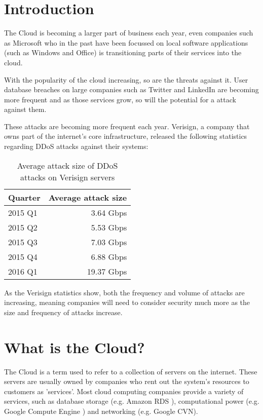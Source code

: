 \section{Introduction}
The Cloud is becoming a larger part of business each year, even companies such as Microsoft who in the past have been focussed on local software applications (such as Windows and Office) is transitioning parts of their services into the cloud. 

With the popularity of the cloud increasing, so are the threats against it. User database breaches on large companies such as Twitter and LinkedIn \cite{linkedin_update_2012} are becoming more frequent and as those services grow, so will the potential for a attack against them.

These attacks are becoming more frequent each year. Verisign, a company that owns part of the internet's core infrastructure, released the following statistics regarding DDoS attacks against their systems:

\begin{table}[h!]
    \centering
    \caption{Average attack size of DDoS attacks on Verisign servers\cite{_download_????}}
    \begin{tabular}{| l | r |}
        \hline
        Quarter & Average attack size \\
        \hline
        2015 Q1 & 3.64 Gbps \\
        2015 Q2 & 5.53 Gbps \\
        2015 Q3 & 7.03 Gbps \\
        2015 Q4 & 6.88 Gbps \\
        2016 Q1 & 19.37 Gbps \\
        \hline
    \end{tabular}
    \label{table:1}
\end{table}

As the Verisign statistics show, both the frequency and volume of attacks are increasing, meaning companies will need to consider security much more as the size and frequency of attacks increase.

\section{What is the Cloud?}
The Cloud is a term used to refer to a collection of servers on the internet.
These servers are usually owned by companies who rent out the system's resources to customers as 'services'. 
Most cloud computing companies provide a variety of services, such as database storage (e.g. Amazon RDS \cite{aws_amazon_2016}), computational power (e.g. Google Compute Engine \cite{google_compute_2016}) and networking (e.g. Google CVN).

